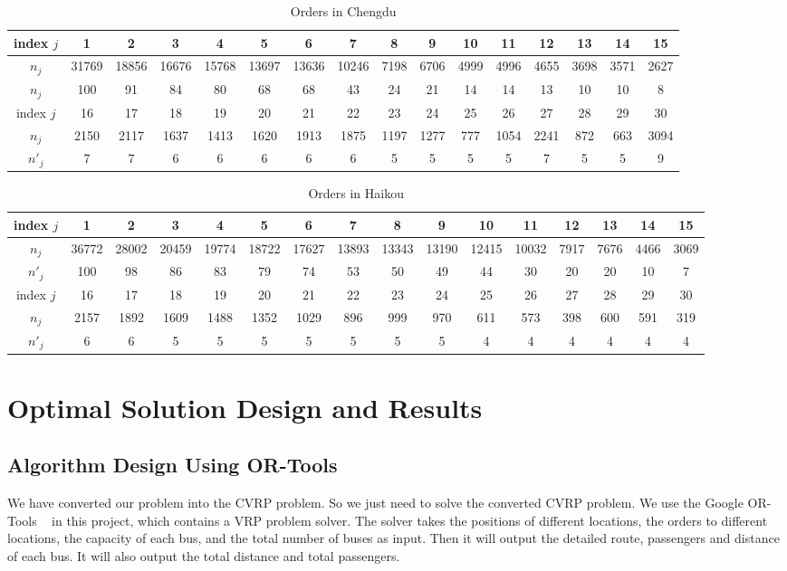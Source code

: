 \documentclass{llncs}
\begin{document}
	\begin{table}
		\caption{Orders in Chengdu}\label{chengdu_logistic}
		\centering
		\begin{tabular}{|c|c|c|c|c|c|c|c|c|c|c|c|c|c|c|c|}
			\hline
		index $j$&	1&2&3&4&5&6&7&8&9&10&11&12&13&14&15\\
		\hline
		$n_j$ &31769&18856&16676&15768&13697&13636&10246&7198&6706&4999&4996&4655&3698&3571&2627\\
		\hline
		$n_j$&100&91&84&80&68&68&43&24&21&14&14&13&10&10&8\\
			\hline
			index $j$&16&17&18&19&20&21&22&23&24&25&26&27&28&29&30\\
			\hline
			$n_j$&2150&2117&1637&1413&1620&1913&1875&1197&1277&777&1054&2241&872&663&3094\\
			\hline
			$n'_j$&7&7&6&6&6&6&6&5&5&5&5&7&5&5&9\\
			\hline
		\end{tabular}
	\end{table}

	\begin{table}
		\caption{Orders in Haikou}\label{haikou_logistic}
		\centering
		\begin{tabular}{|c|c|c|c|c|c|c|c|c|c|c|c|c|c|c|c|}
			\hline
			index $j$&	1&2&3&4&5&6&7&8&9&10&11&12&13&14&15\\
			\hline
			$n_j$&36772&28002&20459&19774&18722&17627&13893&13343&13190&12415&10032&7917&7676&4466&3069\\
			\hline
			$n'_j$&100&98&86&83&79&74&53&50&49&44&30&20&20&10&7\\
			\hline
			index $j$&16&17&18&19&20&21&22&23&24&25&26&27&28&29&30\\
			\hline
			$n_j$&2157&1892&1609&1488&1352&1029&896&999&970&611&573&398&600&591&319\\
			\hline
			$n'_j$&6&6&5&5&5&5&5&5&5&4&4&4&4&4&4\\
			\hline
		\end{tabular}
	\end{table}

\section{Optimal Solution Design and Results}
\subsection{Algorithm Design Using OR-Tools}
    We have converted our problem into the CVRP problem. So we just need to solve the converted CVRP problem. We use the Google OR-Tools ~\cite{ortools} in this project, which contains a VRP problem solver. The solver takes the positions of different locations, the orders to different locations, the capacity of each bus, and the total number of buses as input. Then it will output the detailed route, passengers and distance of each bus. It will also output the total distance and total passengers. 
	
\end{document}
